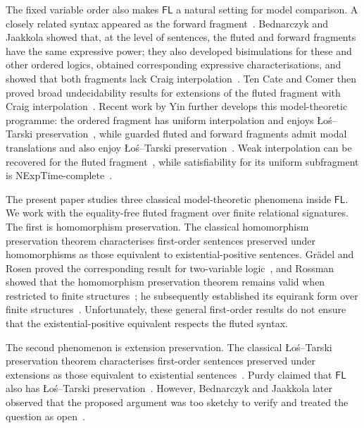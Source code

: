 \documentclass{lmcs}
\newcommand{\FL}{\mathsf{FL}}
\begin{document}
The fixed variable order also makes $\FL$ a natural setting for model
comparison.  A closely related syntax appeared as the forward
fragment~\cite{Bednarczyk2021}.  Bednarczyk and Jaakkola showed that, at the level of
sentences, the fluted and forward fragments have the same expressive power;
they also developed bisimulations for these and other ordered logics, obtained
corresponding expressive characterisations, and showed that both fragments
lack Craig interpolation~\cite{BednarczykJaakkola2022}.  Ten Cate and Comer
then proved broad undecidability results for extensions of the fluted fragment
with Craig interpolation~\cite{TenCateComer2025}.  Recent work by Yin further
develops this model-theoretic programme: the ordered fragment has uniform
interpolation and enjoys \L o\'s--Tarski preservation~\cite{YinOrdered2026},
while guarded fluted and forward fragments admit modal
translations and also enjoy \L o\'s--Tarski
preservation~\cite{YinGuarded2026}.  Weak interpolation can be recovered for
the fluted fragment~\cite{YinSavingCraig2026}, while satisfiability for its
uniform subfragment is NExpTime-complete~\cite{YinUniformFluted2026}.

The present paper studies three classical model-theoretic phenomena inside
$\FL$.  We work with the equality-free fluted fragment over finite relational
signatures.  The first is homomorphism preservation.  The classical
homomorphism preservation theorem characterises first-order sentences
preserved under homomorphisms as those equivalent to existential-positive
sentences.  Gr\"adel and Rosen proved the corresponding result for
two-variable logic~\cite{GradelRosen1999}, and Rossman showed that the
homomorphism preservation theorem remains valid when restricted to finite
structures~\cite{Rossman2008}; he subsequently established its equirank form
over finite structures~\cite{Rossman2025}.  Unfortunately, these general
first-order results
do not ensure that the existential-positive equivalent respects the fluted
syntax.

The second phenomenon is extension preservation.  The classical
\L o\'s--Tarski preservation theorem characterises first-order sentences
preserved under extensions as those equivalent to existential
sentences~\cite{Los1955,Tarski1954}.  Purdy claimed that $\FL$ also has
\L o\'s--Tarski preservation~\cite{Purdy2002}.  However, Bednarczyk and
Jaakkola later observed that the proposed argument was too sketchy to verify
and treated the question as open~\cite{BednarczykJaakkola2022}.
\end{document}
